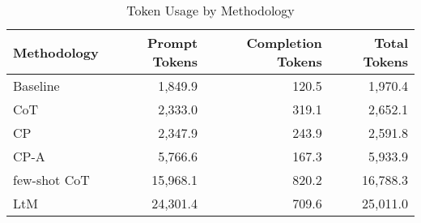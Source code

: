 \begin{table}
\caption{Token Usage by Methodology}
\label{tab:token-usage}
\begin{tabular}{lrrr}
\toprule
Methodology & Prompt Tokens & Completion Tokens & Total Tokens \\
\midrule
Baseline & 1,849.9 & 120.5 & 1,970.4 \\
CoT & 2,333.0 & 319.1 & 2,652.1 \\
CP & 2,347.9 & 243.9 & 2,591.8 \\
CP-A & 5,766.6 & 167.3 & 5,933.9 \\
few-shot CoT & 15,968.1 & 820.2 & 16,788.3 \\
LtM & 24,301.4 & 709.6 & 25,011.0 \\
\bottomrule
\end{tabular}
\end{table}
